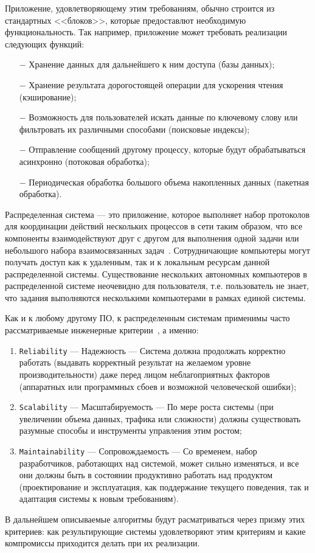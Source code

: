 Приложение, удовлетворяющему этим требованиям, обычно строится из стандартных <<блоков>>, которые предоставлют необходимую функциональность.
Так например, приложение может требовать реализации следующих функций:
\begin{itemize}
  \item[$-$] Хранение данных для дальнейшего к ним доступа (базы данных);
  \item[$-$] Хранение результата дорогостоящей операции для ускорения чтения (кэширование);
  \item[$-$] Возможность для пользователей искать данные по ключевому слову или фильтровать их различными способами (поисковые индексы);
  \item[$-$] Отправление сообщений другому процессу, которые будут обрабатываться асинхронно (потоковая обработка);
  \item[$-$] Периодическая обработка большого объема накопленных данных (пакетная обработка).
\end{itemize}

Распределенная система --- это приложение, которое выполняет набор протоколов для координации действий нескольких процессов в сети таким образом, что все компоненты взаимодействуют друг с другом для выполнения одной задачи или небольшого набора взаимосвязанных задач~\cite{thampi2009introduction}.
Сотрудничающие компьютеры могут получать доступ как к удаленным, так и к локальным ресурсам данной распределенной системы.
Существование нескольких автономных компьютеров в распределенной системе неочевидно для пользователя, т.е. пользователь не знает, что задания выполняются несколькими компьютерами в рамках единой системы. 

Как и к любому другому ПО, к распределенным системам применимы часто рассматриваемые инженерные критерии~\cite{kleppmann2017designing}, а именно:
\begin{enumerate}
  \item \texttt{Reliability} --- Надежность --- Система должна продолжать корректно работать (выдавать корректный результат на
желаемом уровне производительности) даже перед лицом неблагоприятных факторов (аппаратных или
программных сбоев и возможной человеческой ошибки); 
  \item \texttt{Scalability} --- Масштабируемость --- По мере роста системы (при увеличении объема данных, трафика или сложности) должны существовать разумные способы и инструменты управления этим ростом;
  \item \texttt{Maintainability} --- Сопровождаемость --- Со временем, набор разработчиков, работающих над системой, может сильно изменяться, и все они должны быть в состоянии продуктивно работать над продуктом (проектирование и эксплуатация, как поддержание текущего поведения, так и адаптация системы к новым требованиям). 
\end{enumerate}
В дальнейшем описываемые алгоритмы будут расматриваться через призму этих критериев: как результирующие системы удовлетворяют этим критериям и какие компромиссы приходится делать при их реализации.


